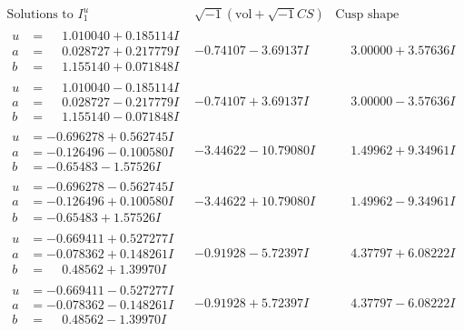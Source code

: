 \documentclass[1p]{elsarticle_modified}
\theoremstyle{definition}
\newcommand{\I}{\sqrt{-1}}
\begin{document}
$$\begin{array}{c|c|c}  
\text{Solutions to }I^u_{1}& \I (\text{vol} + \sqrt{-1}CS) & \text{Cusp shape}\\
 \hline 
\begin{aligned}
u &= \phantom{-}1.010040 + 0.185114 I \\
a &= \phantom{-}0.028727 + 0.217779 I \\
b &= \phantom{-}1.155140 + 0.071848 I\end{aligned}
 & -0.74107 - 3.69137 I & \phantom{-}3.00000 + 3.57636 I \\ \hline\begin{aligned}
u &= \phantom{-}1.010040 - 0.185114 I \\
a &= \phantom{-}0.028727 - 0.217779 I \\
b &= \phantom{-}1.155140 - 0.071848 I\end{aligned}
 & -0.74107 + 3.69137 I & \phantom{-}3.00000 - 3.57636 I \\ \hline\begin{aligned}
u &= -0.696278 + 0.562745 I \\
a &= -0.126496 - 0.100580 I \\
b &= -0.65483 - 1.57526 I\end{aligned}
 & -3.44622 - 10.79080 I & \phantom{-}1.49962 + 9.34961 I \\ \hline\begin{aligned}
u &= -0.696278 - 0.562745 I \\
a &= -0.126496 + 0.100580 I \\
b &= -0.65483 + 1.57526 I\end{aligned}
 & -3.44622 + 10.79080 I & \phantom{-}1.49962 - 9.34961 I \\ \hline\begin{aligned}
u &= -0.669411 + 0.527277 I \\
a &= -0.078362 + 0.148261 I \\
b &= \phantom{-}0.48562 + 1.39970 I\end{aligned}
 & -0.91928 - 5.72397 I & \phantom{-}4.37797 + 6.08222 I \\ \hline\begin{aligned}
u &= -0.669411 - 0.527277 I \\
a &= -0.078362 - 0.148261 I \\
b &= \phantom{-}0.48562 - 1.39970 I\end{aligned}
 & -0.91928 + 5.72397 I & \phantom{-}4.37797 - 6.08222 I \\ \hline\begin{aligned}

\end{aligned}
\end{array}$$
\end{document}
